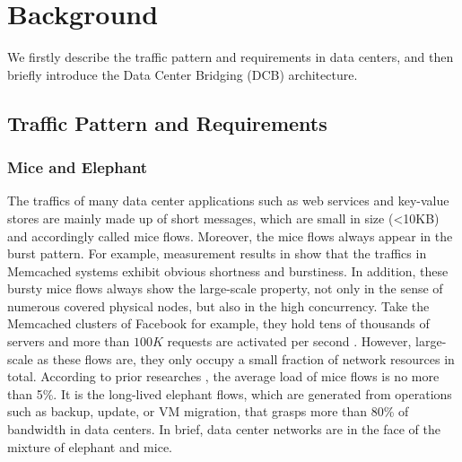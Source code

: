 \documentclass[]{sig-alternate-10pt}
\begin{document}
 \section{Background}
\label{background}

We firstly describe the traffic pattern and requirements in data centers, and then briefly introduce the Data Center Bridging (DCB) architecture.


\subsection{Traffic Pattern and Requirements}

\subsubsection{Mice and Elephant}
The traffics of many data center applications such as web services and key-value stores are mainly made up of short messages, which are small in size (<10KB) and accordingly called mice flows. Moreover, the mice flows always appear in the burst pattern.
For example, measurement results in \cite{atikoglu2012workload} show that the traffics in Memcached systems exhibit obvious shortness and burstiness.
In addition, these bursty mice flows always show the large-scale property, not only in the sense of numerous covered physical nodes, but also in the high concurrency.
Take the Memcached clusters of Facebook for example, they hold tens of thousands of servers and more than $100K$ requests are activated per second \cite{nishtala2013scaling}.
However, large-scale as these flows are, they only occupy a small fraction of network resources in total. According to prior researches \cite{alizadeh2011data, benson2010network, gill2011understanding}, the average load of mice flows is no more than 5\%. It is the long-lived elephant flows, which are generated from operations such as backup, update, or VM migration, that grasps more than 80\% of bandwidth in data centers.
In brief, data center networks are in the face of the mixture of elephant and mice.
\end{document}
